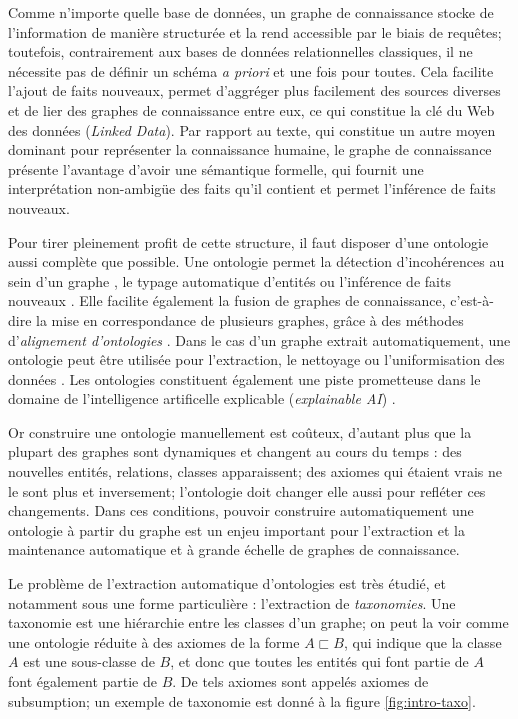 Comme n'importe quelle base de données, un graphe de connaissance stocke de l'information de manière structurée et la rend accessible par le biais de requêtes; toutefois, contrairement aux bases de données relationnelles classiques, il ne nécessite pas de définir un schéma \textit{a priori} et une fois pour toutes. Cela facilite l'ajout de faits nouveaux, permet d'aggréger plus facilement des sources diverses et de lier des graphes de connaissance entre eux, ce qui constitue la clé du Web des données (\textit{Linked Data}).
Par rapport au texte, qui constitue un autre moyen dominant pour représenter la connaissance humaine, le graphe de connaissance présente l'avantage d'avoir une sémantique formelle, qui fournit une interprétation non-ambigüe des faits qu'il contient et permet l'inférence de faits nouveaux.

Pour tirer pleinement profit de cette structure, il faut disposer d'une ontologie aussi complète que possible. %
%
Une ontologie permet la détection d'incohérences au sein d'un graphe \cite{inconsistencies2012dbpedia}, le typage automatique d'entités \cite{typing2017kejriwal} ou l'inférence de faits nouveaux \cite{inference2015dinto}. Elle facilite également la fusion de graphes de connaissance, c'est-à-dire la mise en correspondance de plusieurs graphes, grâce à des méthodes d'\textit{alignement d'ontologies} \cite{otero2015ontology}. Dans le cas d'un graphe extrait automatiquement, une ontologie peut être utilisée pour l'extraction, le nettoyage ou l'uniformisation des données \cite{webmining2011bhatia, webmining2014li}. Les ontologies constituent également une piste prometteuse dans le domaine de l'intelligence artificelle explicable (\textit{explainable AI}) \cite{explainable2018holzinger, explainable2019cardillo, explainable2019semantic}.

Or construire une ontologie manuellement est coûteux, d'autant plus que la plupart des graphes sont dynamiques et changent au cours du temps : des nouvelles entités, relations, classes apparaissent; des axiomes qui étaient vrais ne le sont plus et inversement; l'ontologie doit changer elle aussi pour refléter ces changements. Dans ces conditions, pouvoir construire automatiquement une ontologie à partir du graphe est un enjeu important pour l'extraction et la maintenance automatique et à grande échelle de graphes de connaissance.

Le problème de l'extraction automatique d'ontologies est très étudié, et notamment sous une forme particulière : l'extraction de \textit{taxonomies}. Une taxonomie est une hiérarchie entre les classes d'un graphe; on peut la voir comme une ontologie réduite à des axiomes de la forme $A \sqsubset B$, qui indique que la classe $A$ est une sous-classe de $B$, et donc que toutes les entités qui font partie de $A$ font également partie de $B$. De tels axiomes sont appelés axiomes de subsumption; un exemple de taxonomie est donné à la figure \ref{fig:intro-taxo}.

